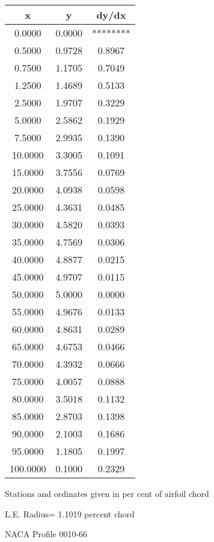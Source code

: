 \documentclass[11pt]{book}
\begin{document}
 \vspace{8mm}
 \begin{tabular}{|c|c|c|} \hline 
  x  &  y  &  dy/dx \\
 \hline
0.0000 & 0.0000 & ******** \\
0.5000 & 0.9728 & 0.8967 \\
0.7500 & 1.1705 & 0.7049 \\
1.2500 & 1.4689 & 0.5133 \\
2.5000 & 1.9707 & 0.3229 \\
5.0000 & 2.5862 & 0.1929 \\
7.5000 & 2.9935 & 0.1390 \\
10.0000 & 3.3005 & 0.1091 \\
15.0000 & 3.7556 & 0.0769 \\
20.0000 & 4.0938 & 0.0598 \\
25.0000 & 4.3631 & 0.0485 \\
30.0000 & 4.5820 & 0.0393 \\
35.0000 & 4.7569 & 0.0306 \\
40.0000 & 4.8877 & 0.0215 \\
45.0000 & 4.9707 & 0.0115 \\
50.0000 & 5.0000 & 0.0000 \\
55.0000 & 4.9676 & 0.0133 \\
60.0000 & 4.8631 & 0.0289 \\
65.0000 & 4.6753 & 0.0466 \\
70.0000 & 4.3932 & 0.0666 \\
75.0000 & 4.0057 & 0.0888 \\
80.0000 & 3.5018 & 0.1132 \\
85.0000 & 2.8703 & 0.1398 \\
90.0000 & 2.1003 & 0.1686 \\
95.0000 & 1.1805 & 0.1997 \\
100.0000 & 0.1000 & 0.2329 \\
 \hline
 \end{tabular}
 \vspace{8mm}


Stations and ordinates given in per cent of airfoil chord 


L.E. Radius=  1.1019 percent chord
 \newpage
  \label{p0010-66}
 \begin{Large}
 NACA Profile 0010-66
 \end{Large}
  
\end{document}
